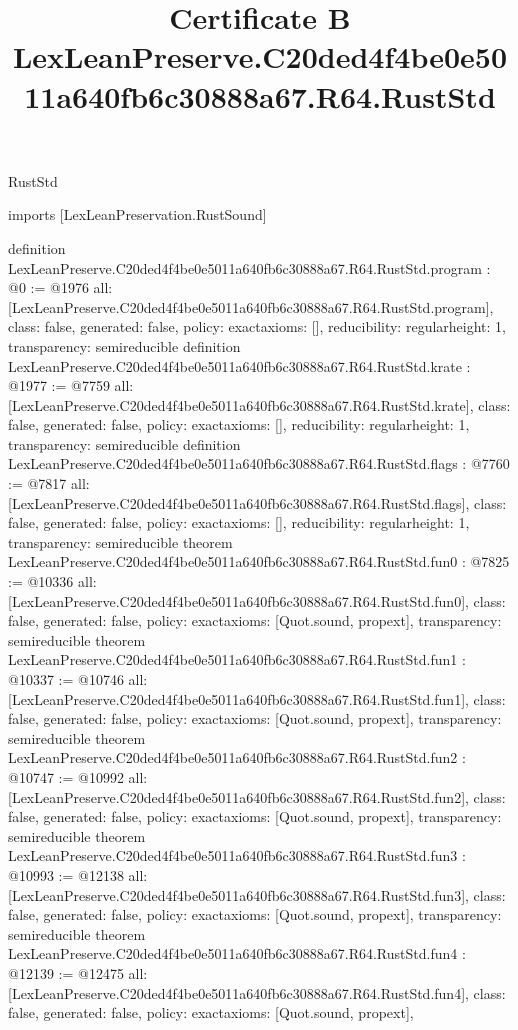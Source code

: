 \begin{lexlean}{RustStd}
\title{Certificate B LexLeanPreserve.C20ded4f4be0e5011a640fb6c30888a67.R64.RustStd}
\begin{coremodule}
imports [LexLeanPreservation.RustSound]

definition LexLeanPreserve.C20ded4f4be0e5011a640fb6c30888a67.R64.RustStd.program : @0 := @1976 {
  all: [LexLeanPreserve.C20ded4f4be0e5011a640fb6c30888a67.R64.RustStd.program],
  class: false,
  generated: false,
  policy: exact{axioms: []},
  reducibility: regular{height: 1},
  transparency: semireducible
}
definition LexLeanPreserve.C20ded4f4be0e5011a640fb6c30888a67.R64.RustStd.krate : @1977 := @7759 {
  all: [LexLeanPreserve.C20ded4f4be0e5011a640fb6c30888a67.R64.RustStd.krate],
  class: false,
  generated: false,
  policy: exact{axioms: []},
  reducibility: regular{height: 1},
  transparency: semireducible
}
definition LexLeanPreserve.C20ded4f4be0e5011a640fb6c30888a67.R64.RustStd.flags : @7760 := @7817 {
  all: [LexLeanPreserve.C20ded4f4be0e5011a640fb6c30888a67.R64.RustStd.flags],
  class: false,
  generated: false,
  policy: exact{axioms: []},
  reducibility: regular{height: 1},
  transparency: semireducible
}
theorem LexLeanPreserve.C20ded4f4be0e5011a640fb6c30888a67.R64.RustStd.fun0 : @7825 := @10336 {
  all: [LexLeanPreserve.C20ded4f4be0e5011a640fb6c30888a67.R64.RustStd.fun0],
  class: false,
  generated: false,
  policy: exact{axioms: [Quot.sound, propext]},
  transparency: semireducible
}
theorem LexLeanPreserve.C20ded4f4be0e5011a640fb6c30888a67.R64.RustStd.fun1 : @10337 := @10746 {
  all: [LexLeanPreserve.C20ded4f4be0e5011a640fb6c30888a67.R64.RustStd.fun1],
  class: false,
  generated: false,
  policy: exact{axioms: [Quot.sound, propext]},
  transparency: semireducible
}
theorem LexLeanPreserve.C20ded4f4be0e5011a640fb6c30888a67.R64.RustStd.fun2 : @10747 := @10992 {
  all: [LexLeanPreserve.C20ded4f4be0e5011a640fb6c30888a67.R64.RustStd.fun2],
  class: false,
  generated: false,
  policy: exact{axioms: [Quot.sound, propext]},
  transparency: semireducible
}
theorem LexLeanPreserve.C20ded4f4be0e5011a640fb6c30888a67.R64.RustStd.fun3 : @10993 := @12138 {
  all: [LexLeanPreserve.C20ded4f4be0e5011a640fb6c30888a67.R64.RustStd.fun3],
  class: false,
  generated: false,
  policy: exact{axioms: [Quot.sound, propext]},
  transparency: semireducible
}
theorem LexLeanPreserve.C20ded4f4be0e5011a640fb6c30888a67.R64.RustStd.fun4 : @12139 := @12475 {
  all: [LexLeanPreserve.C20ded4f4be0e5011a640fb6c30888a67.R64.RustStd.fun4],
  class: false,
  generated: false,
  policy: exact{axioms: [Quot.sound, propext]},
}
\end{coremodule}
\end{lexlean}
